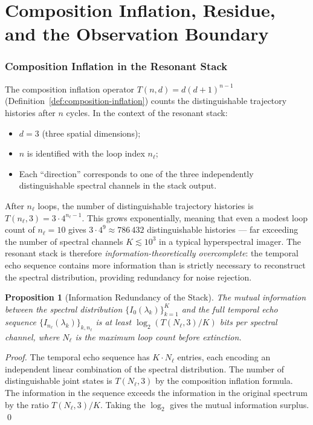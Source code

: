 \documentclass[11pt,twocolumn,a4paper]{article}
\theoremstyle{plain}
\newtheorem{proposition}[theorem]{Proposition}
\theoremstyle{definition}
\theoremstyle{remark}
\begin{document}
\part{Composition Inflation, Residue, and the Observation Boundary}

\section{Composition Inflation in the Resonant Stack}
\label{sec:inflation-stack}

The composition inflation operator $T(n,d)=d(d+1)^{n-1}$ (Definition~\ref{def:composition-inflation}) counts the distinguishable trajectory histories after $n$ cycles. In the context of the resonant stack:

\begin{itemize}[noitemsep]
  \item $d=3$ (three spatial dimensions);
  \item $n$ is identified with the loop index $n_\ell$;
  \item Each ``direction'' corresponds to one of the three independently distinguishable spectral channels in the stack output.
\end{itemize}

After $n_\ell$ loops, the number of distinguishable trajectory histories is $T(n_\ell,3)=3\cdot 4^{n_\ell-1}$. This grows exponentially, meaning that even a modest loop count of $n_\ell=10$ gives $3\cdot 4^9\approx 786\,432$ distinguishable histories — far exceeding the number of spectral channels $K\lesssim 10^3$ in a typical hyperspectral imager. The resonant stack is therefore \emph{information-theoretically overcomplete}: the temporal echo sequence contains more information than is strictly necessary to reconstruct the spectral distribution, providing redundancy for noise rejection.

\begin{proposition}[Information Redundancy of the Stack]
\label{prop:redundancy}
The mutual information between the spectral distribution $\{I_0(\lambda_k)\}_{k=1}^K$ and the full temporal echo sequence $\{I_{n_\ell}(\lambda_k)\}_{k,n_\ell}$ is at least $\log_2(T(N_\ell,3)/K)$ bits per spectral channel, where $N_\ell$ is the maximum loop count before extinction.
\end{proposition}

\begin{proof}
The temporal echo sequence has $K\cdot N_\ell$ entries, each encoding an independent linear combination of the spectral distribution. The number of distinguishable joint states is $T(N_\ell,3)$ by the composition inflation formula. The information in the sequence exceeds the information in the original spectrum by the ratio $T(N_\ell,3)/K$. Taking the $\log_2$ gives the mutual information surplus. \qed
\end{proof}
\end{document}
